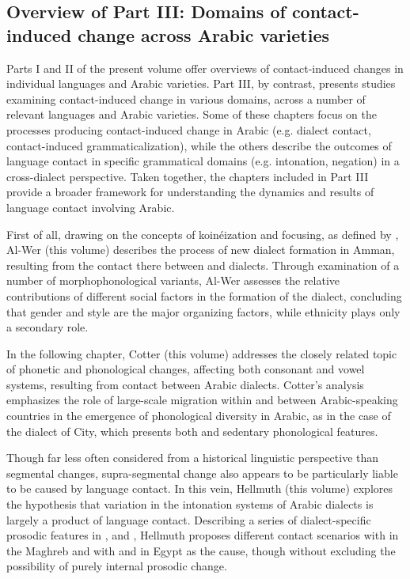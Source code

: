 \documentclass[output=paper]{langsci/langscibook}
\begin{document}
\subsection{Overview of Part III: Domains of contact-induced
change across Arabic varieties}\label{intropartIIIoverview}
Parts I and II of the present volume offer overviews of contact-induced changes in individual languages and Arabic varieties. Part III, by contrast, presents studies examining contact-induced change in various domains, across a number of relevant languages and Arabic varieties. Some of these chapters focus on the processes producing contact-induced change in Arabic (e.g. dialect contact, contact-induced grammaticalization), while the others describe the outcomes of language contact in specific grammatical domains (e.g. intonation, negation) in a cross-dialect perspective. Taken together, the chapters included in Part III provide a broader framework for understanding the dynamics and results of language contact involving Arabic. 

First of all, drawing on the concepts of koinéization and focusing, as defined by \citet{Trudgill2004}, Al-Wer (this volume) describes the process of new dialect formation in Amman, resulting from the contact there between  and  dialects. Through examination of a number of morphophonological variants, Al-Wer assesses the relative contributions of different social factors in the formation of the  dialect, concluding that gender and style are the major organizing factors, while ethnicity plays only a secondary role.

In the following chapter, Cotter (this volume) addresses the closely related topic of phonetic and phonological changes, affecting both consonant and vowel systems, resulting from  contact between Arabic dialects. Cotter's analysis emphasizes the role of large-scale migration within and between Arabic-speaking countries in the emergence of phonological diversity in Arabic, as in the case of the dialect of  City, which presents both  and sedentary phonological features.

Though far less often considered from a historical linguistic perspective than segmental changes, supra-segmental change also appears to be particularly liable to be caused by language contact. In this vein, Hellmuth (this volume) explores the hypothesis that variation in the intonation systems of Arabic dialects is largely a product of language contact. Describing a series of dialect-specific prosodic features in ,  and , Hellmuth proposes different contact scenarios with  in the Maghreb and with  and  in Egypt as the cause, though without excluding the possibility of purely internal prosodic change. 
\end{document}
